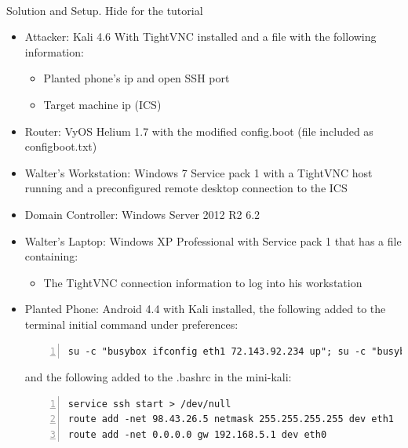 \documentclass[12pt]{extarticle}
\begin{document}
\begin{Large}
\\Solution and Setup. Hide for the tutorial
\begin{itemize}
\item Attacker: Kali 4.6 With TightVNC installed and a file with the following information:
\begin{itemize}
\item Planted phone's ip and open SSH port
\item Target machine ip (ICS)
\end{itemize}
\item Router: VyOS Helium 1.7 with the modified config.boot (file included as configboot.txt)
\item Walter's Workstation: Windows 7 Service pack 1 with a TightVNC host running and a preconfigured remote desktop connection to the ICS
\item Domain Controller: Windows Server 2012 R2 6.2
\item Walter's Laptop: Windows XP Professional with Service pack 1 that has a file containing:
\begin{itemize}
\item The TightVNC connection information to log into his workstation
\end{itemize}
\item Planted Phone: Android 4.4 with Kali installed, the following added to the terminal initial command under preferences:
\begin{lstlisting}[numbers = left, breaklines = true, frame = single]
su -c "busybox ifconfig eth1 72.143.92.234 up"; su -c "busybox ifconfig eth0 192.168.5.105 up"; su -c "/data/data/ru.meefik.linuxdeploy/bin/linuxdeploy shell"
\end{lstlisting}
and the following added to the .bashrc in the mini-kali:
\begin{lstlisting}[numbers = left, breaklines = true, frame = single]
service ssh start > /dev/null
route add -net 98.43.26.5 netmask 255.255.255.255 dev eth1
route add -net 0.0.0.0 gw 192.168.5.1 dev eth0
\end{lstlisting}


\end{itemize}
\end{Large}
\end{document}
